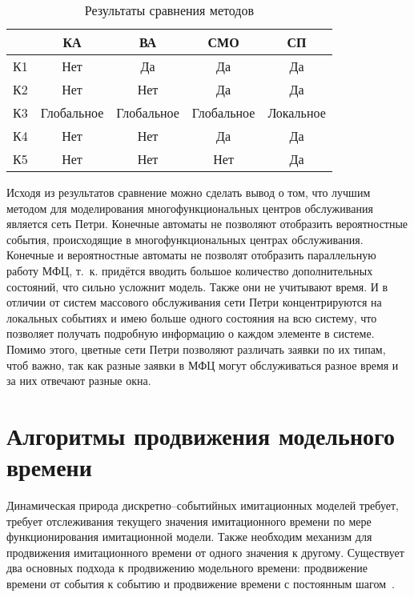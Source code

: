 \begin{table}[!ht]
	\begin{center}
		\begin{threeparttable}
			\captionsetup{justification=raggedleft,singlelinecheck=off}
			\caption{Результаты сравнения  методов}
			\label{tbl:cmp}
			\begin{tabular}{|l|c|c|c|c|}
				\hline
				\makecell[c]{Критерий} & КА & ВА & СМО & СП \\\hline
				К1	& Нет & Да &	Да & Да \\\hline
				К2 & Нет & Нет & Да & Да \\\hline
				К3 & Глобальное & Глобальное & Глобальное &	Локальное \\\hline
				К4 & Нет & Нет & Да & Да \\\hline
				К5 & Нет & Нет & Нет & Да \\\hline
			\end{tabular}
		\end{threeparttable}
	\end{center}
\end{table}

Исходя из результатов сравнение можно сделать вывод о том, что лучшим методом для моделирования многофункциональных центров обслуживания является сеть Петри. Конечные автоматы не позволяют отобразить вероятностные события, происходящие в многофункциональных центрах обслуживания. Конечные и вероятностные автоматы не позволят отобразить параллельную работу МФЦ, т.~к. придётся вводить большое количество дополнительных состояний, что сильно усложнит модель. Также они не учитывают время. И в отличии от систем массового обслуживания сети Петри концентрируются на локальных событиях и имею больше одного состояния на всю систему, что позволяет получать подробную информацию о каждом элементе в системе. Помимо этого, цветные сети Петри позволяют различать заявки по их типам, чтоб важно, так как разные заявки в МФЦ могут обслуживаться разное время и за них отвечают разные окна.


\section{Алгоритмы продвижения модельного времени}

Динамическая природа дискретно--событийных имитационных моделей требует, требует отслеживания текущего значения имитационного времени по мере функционирования имитационной модели. Также необходим механизм для продвижения имитационного времени от одного значения к другому. Существует два основных подхода к продвижению модельного времени: продвижение времени от события к событию и продвижение времени с постоянным
шагом~\cite{time_alg}.


